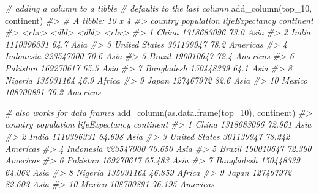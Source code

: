 \documentclass[
]{book}
\newenvironment{Shaded}{\begin{snugshade}}{\end{snugshade}}
\newcommand{\CommentTok}[1]{\textcolor[rgb]{0.56,0.35,0.01}{\textit{#1}}}
\newcommand{\FunctionTok}[1]{\textcolor[rgb]{0.00,0.00,0.00}{#1}}
\newcommand{\NormalTok}[1]{#1}
\begin{document}
\begin{Shaded}
\begin{Highlighting}[]
\CommentTok{\# adding a column to a tibble}
\CommentTok{\# defaults to the last column}
\FunctionTok{add\_column}\NormalTok{(top\_10, continent)}
\CommentTok{\#\textgreater{} \# A tibble: 10 x 4}
\CommentTok{\#\textgreater{}    country       population lifeExpectancy continent}
\CommentTok{\#\textgreater{}    \textless{}chr\textgreater{}              \textless{}dbl\textgreater{}          \textless{}dbl\textgreater{} \textless{}chr\textgreater{}    }
\CommentTok{\#\textgreater{}  1 China         1318683096           73.0 Asia     }
\CommentTok{\#\textgreater{}  2 India         1110396331           64.7 Asia     }
\CommentTok{\#\textgreater{}  3 United States  301139947           78.2 Americas }
\CommentTok{\#\textgreater{}  4 Indonesia      223547000           70.6 Asia     }
\CommentTok{\#\textgreater{}  5 Brazil         190010647           72.4 Americas }
\CommentTok{\#\textgreater{}  6 Pakistan       169270617           65.5 Asia     }
\CommentTok{\#\textgreater{}  7 Bangladesh     150448339           64.1 Asia     }
\CommentTok{\#\textgreater{}  8 Nigeria        135031164           46.9 Africa   }
\CommentTok{\#\textgreater{}  9 Japan          127467972           82.6 Asia     }
\CommentTok{\#\textgreater{} 10 Mexico         108700891           76.2 Americas}

\CommentTok{\# also works for data frames}
\FunctionTok{add\_column}\NormalTok{(}\FunctionTok{as.data.frame}\NormalTok{(top\_10), continent)}
\CommentTok{\#\textgreater{}          country population lifeExpectancy continent}
\CommentTok{\#\textgreater{} 1          China 1318683096         72.961      Asia}
\CommentTok{\#\textgreater{} 2          India 1110396331         64.698      Asia}
\CommentTok{\#\textgreater{} 3  United States  301139947         78.242  Americas}
\CommentTok{\#\textgreater{} 4      Indonesia  223547000         70.650      Asia}
\CommentTok{\#\textgreater{} 5         Brazil  190010647         72.390  Americas}
\CommentTok{\#\textgreater{} 6       Pakistan  169270617         65.483      Asia}
\CommentTok{\#\textgreater{} 7     Bangladesh  150448339         64.062      Asia}
\CommentTok{\#\textgreater{} 8        Nigeria  135031164         46.859    Africa}
\CommentTok{\#\textgreater{} 9          Japan  127467972         82.603      Asia}
\CommentTok{\#\textgreater{} 10        Mexico  108700891         76.195  Americas}


\end{Highlighting}
\end{Shaded}
\end{document}
